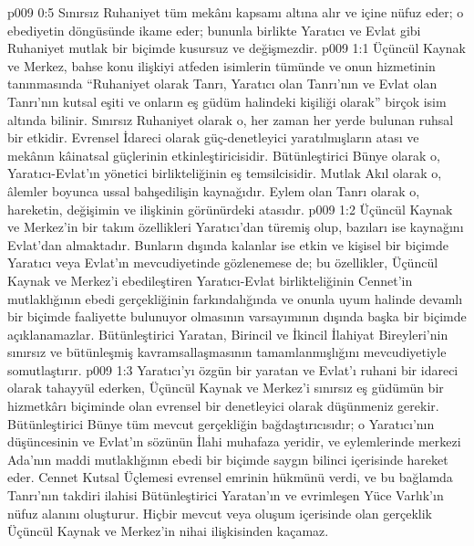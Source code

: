\vs p009 0:5 Sınırsız Ruhaniyet tüm mekânı kapsamı altına alır ve içine nüfuz eder; o ebediyetin döngüsünde ikame eder; bununla birlikte Yaratıcı ve Evlat gibi Ruhaniyet mutlak bir biçimde kusursuz ve değişmezdir.
\vs p009 1:1 Üçüncül Kaynak ve Merkez, bahse konu ilişkiyi atfeden isimlerin tümünde ve onun hizmetinin tanınmasında “Ruhaniyet olarak Tanrı, Yaratıcı olan Tanrı’nın ve Evlat olan Tanrı’nın kutsal eşiti ve onların eş güdüm halindeki kişiliği olarak” birçok isim altında bilinir. Sınırsız Ruhaniyet olarak o, her zaman her yerde bulunan ruhsal bir etkidir. Evrensel İdareci olarak güç\hyp{}denetleyici yaratılmışların atası ve mekânın kâinatsal güçlerinin etkinleştiricisidir. Bütünleştirici Bünye olarak o, Yaratıcı\hyp{}Evlat’ın yönetici birlikteliğinin eş temsilcisidir. Mutlak Akıl olarak o, âlemler boyunca ussal bahşedilişin kaynağıdır. Eylem olan Tanrı olarak o, hareketin, değişimin ve ilişkinin görünürdeki atasıdır.
\vs p009 1:2 Üçüncül Kaynak ve Merkez’in bir takım özellikleri Yaratıcı’dan türemiş olup, bazıları ise kaynağını Evlat’dan almaktadır. Bunların dışında kalanlar ise etkin ve kişisel bir biçimde Yaratıcı veya Evlat’ın mevcudiyetinde gözlenemese de; bu özellikler, Üçüncül Kaynak ve Merkez’i ebedileştiren Yaratıcı\hyp{}Evlat birlikteliğinin Cennet’in mutlaklığının ebedi gerçekliğinin farkındalığında ve onunla uyum halinde devamlı bir biçimde faaliyette bulunuyor olmasının varsayımının dışında başka bir biçimde açıklanamazlar. Bütünleştirici Yaratan, Birincil ve İkincil İlahiyat Bireyleri’nin sınırsız ve bütünleşmiş kavramsallaşmasının tamamlanmışlığını mevcudiyetiyle somutlaştırır.
\vs p009 1:3 Yaratıcı’yı özgün bir yaratan ve Evlat’ı ruhani bir idareci olarak tahayyül ederken, Üçüncül Kaynak ve Merkez’i sınırsız eş güdümün bir hizmetkârı biçiminde olan evrensel bir denetleyici olarak düşünmeniz gerekir. Bütünleştirici Bünye tüm mevcut gerçekliğin bağdaştırıcısıdır; o Yaratıcı’nın düşüncesinin ve Evlat’ın sözünün İlahi muhafaza yeridir, ve eylemlerinde merkezi Ada’nın maddi mutlaklığının ebedi bir biçimde saygın bilinci içerisinde hareket eder. Cennet Kutsal Üçlemesi  evrensel emrinin hükmünü verdi, ve bu bağlamda Tanrı’nın takdiri ilahisi Bütünleştirici Yaratan’ın ve evrimleşen Yüce Varlık’ın nüfuz alanını oluşturur. Hiçbir mevcut veya oluşum içerisinde olan gerçeklik Üçüncül Kaynak ve Merkez’in nihai ilişkisinden kaçamaz.
